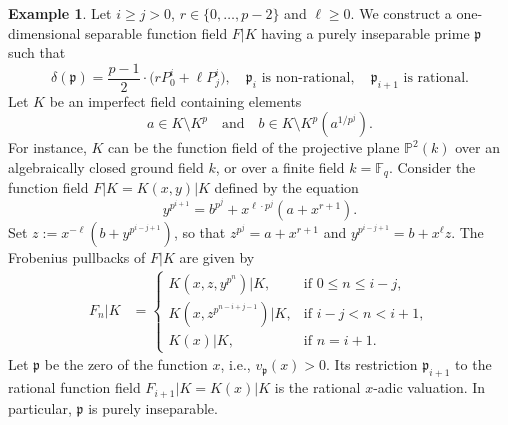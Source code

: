 \documentclass[12pt,reqno]{amsart}%
\theoremstyle{definition}
\newtheorem{example}[prop]{Example}
\theoremstyle{remark}
\newcommand{\PP}{\mathbb{P}}
\newcommand{\F}{\mathbb{F}}
\newcommand{\pp}{\mathfrak{p}}
\newcommand{\de}{\delta}
\begin{document}
\begin{example} \label{2022_07_19_19:00}
Let $i\geq j>0$, $r\in\{0,\dots,p-2\}$ and $\ell\geq0$.
We construct a one-dimensional separable function field $F|K$ having a purely inseparable prime $\pp$ such that
\[ \de(\pp) = \frac{p-1}2 \cdot \big( r P_0^i + \ell P_j^{i} \big), \quad \text{$\pp_i$ is non-rational}, \quad \text{$\pp_{i+1}$ is rational}. \]
Let $K$ be an imperfect field containing elements
\begin{equation}\label{2024_08_29_20:15}
    a\in K\setminus K^p \quad \text{and} \quad b\in K \setminus K^p(a^{1/p^{j}}).
\end{equation}
For instance, $K$ can be the function field of the projective plane $\PP^2(k)$ over an algebraically closed ground field $k$, or over a finite field $k=\F_q$.
Consider the function field $F|K=K(x,y)|K$ defined by the equation
\[ y^{p^{i+1}} = b^{p^j} + x^{\ell \cdot p^j} (a + x^{r+1}). \]
Set $z:= x^{-\ell} (b + y^{p^{i-j+1}})$, so that $z^{p^j} = a + x^{r+1}$ and $y^{p^{i-j+1}} = b + x^\ell z$.
The Frobenius pullbacks of $F|K$ are given by
\begin{align*}
    F_n|K &= 
    \begin{cases}
        K(x,z,y^{p^{n}})|K, & \text{if $0\leq n \leq i-j$},\\
        K(x,z^{p^{n-i+j-1}})|K, & \text{if $i-j < n < i+1$}, \\
        K(x)|K, & \text{if $n=i+1$}.
    \end{cases}
\end{align*}
Let $\pp$ be the zero of the function $x$, i.e., $v_\pp(x)>0$.
Its restriction $\pp_{i+1}$ to the rational function field $F_{i+1}|K = K(x)|K$ is the rational $x$-adic valuation.
In particular, $\pp$ is purely inseparable.


\end{example}
\end{document}
